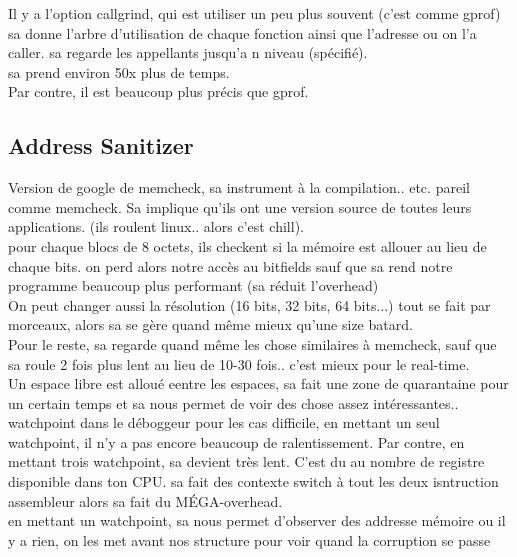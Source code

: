 \documentclass[oneside]{book}
\begin{document}
Il y a l'option callgrind, qui est utiliser un peu plus souvent (c'est comme gprof) sa donne l'arbre d'utilisation de chaque fonction ainsi que l'adresse ou on l'a caller. sa regarde les appellants jusqu'a n niveau (spécifié).  \\

sa prend environ 50x plus de temps.\\

Par contre, il est beaucoup plus précis que gprof.
\subsection{Address Sanitizer}
Version de google de memcheck, sa instrument à la compilation.. etc. pareil comme memcheck. Sa implique qu'ils ont une version source de toutes leurs applications. (ils roulent linux.. alors c'est chill).\\

pour chaque blocs de 8 octets, ils checkent si la mémoire est allouer au lieu de chaque bits. on perd alors notre accès au bitfields sauf que sa rend notre programme beaucoup plus performant (sa réduit l'overhead)\\

On peut changer aussi la résolution (16 bits, 32 bits, 64 bits...) tout se fait par morceaux, alors sa se gère quand même mieux qu'une size batard.\\

Pour le reste, sa regarde quand même les chose similaires à memcheck, sauf que sa roule 2 fois plus lent au lieu de 10-30 fois.. c'est mieux pour le real-time.\\

Un espace libre est alloué eentre les espaces, sa fait une zone de quarantaine pour un certain temps et sa nous permet de voir des chose assez intéressantes..\\

watchpoint dans le déboggeur pour les cas difficile, en mettant un seul watchpoint, il n'y a pas encore beaucoup de ralentissement. Par contre, en mettant trois watchpoint, sa devient très lent. C'est du au nombre de registre disponible dans ton CPU. sa fait des contexte switch à tout les deux isntruction assembleur alors sa fait du MÉGA-overhead.\\

en mettant un watchpoint, sa nous permet d'observer des addresse mémoire ou il y a rien, on les met avant nos structure pour voir quand la corruption se passe
\end{document}

